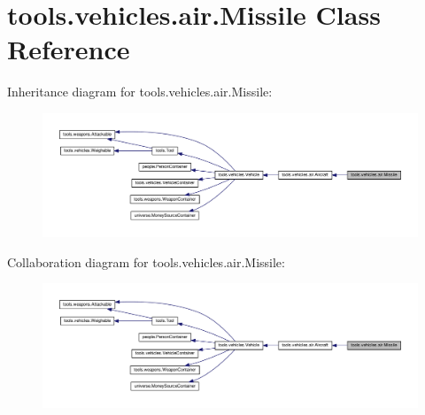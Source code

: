 \hypertarget{classtools_1_1vehicles_1_1air_1_1_missile}{}\section{tools.\+vehicles.\+air.\+Missile Class Reference}
\label{classtools_1_1vehicles_1_1air_1_1_missile}


Inheritance diagram for tools.\+vehicles.\+air.\+Missile\+:
\nopagebreak
\begin{figure}[H]
\begin{center}
\leavevmode
\includegraphics[width=350pt]{classtools_1_1vehicles_1_1air_1_1_missile__inherit__graph}
\end{center}
\end{figure}


Collaboration diagram for tools.\+vehicles.\+air.\+Missile\+:
\nopagebreak
\begin{figure}[H]
\begin{center}
\leavevmode
\includegraphics[width=350pt]{classtools_1_1vehicles_1_1air_1_1_missile__coll__graph}
\end{center}
\end{figure}
